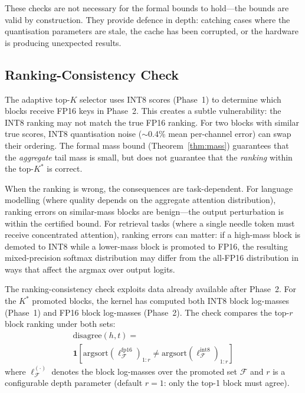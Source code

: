 \documentclass[10pt,twocolumn,a4paper]{article}
\theoremstyle{definition}
\theoremstyle{remark}
\begin{document}
These checks are not necessary for the formal bounds to hold---the bounds are valid by construction.  They provide defence in depth: catching cases where the quantisation parameters are stale, the cache has been corrupted, or the hardware is producing unexpected results.

\subsection{Ranking-Consistency Check}
\label{sec:ranking_consistency}

The adaptive top-$K$ selector uses INT8 scores (Phase~1) to determine which blocks receive FP16 keys in Phase~2.  This creates a subtle vulnerability: the INT8 ranking may not match the true FP16 ranking.  For two blocks with similar true scores, INT8 quantisation noise ($\sim$0.4\% mean per-channel error) can swap their ordering.  The formal mass bound (Theorem~\ref{thm:mass}) guarantees that the \emph{aggregate} tail mass is small, but does not guarantee that the \emph{ranking} within the top-$K^*$ is correct.

When the ranking is wrong, the consequences are task-dependent.  For language modelling (where quality depends on the aggregate attention distribution), ranking errors on similar-mass blocks are benign---the output perturbation is within the certified bound.  For retrieval tasks (where a single needle token must receive concentrated attention), ranking errors can matter: if a high-mass block is demoted to INT8 while a lower-mass block is promoted to FP16, the resulting mixed-precision softmax distribution may differ from the all-FP16 distribution in ways that affect the argmax over output logits.

The ranking-consistency check exploits data already available after Phase~2.  For the $K^*$ promoted blocks, the kernel has computed both INT8 block log-masses (Phase~1) and FP16 block log-masses (Phase~2).  The check compares the top-$r$ block ranking under both sets:
\begin{multline}
  \mathrm{disagree}(h, t) = \\
  \mathbf{1}\!\left[\mathrm{argsort}(\ell^{\mathrm{fp16}}_{\mathcal{F}})_{1:r}
  \neq \mathrm{argsort}(\ell^{\mathrm{int8}}_{\mathcal{F}})_{1:r}\right]
\end{multline}
where $\ell^{(\cdot)}_{\mathcal{F}}$ denotes the block log-masses over the promoted set $\mathcal{F}$ and $r$ is a configurable depth parameter (default $r{=}1$: only the top-1 block must agree).
\end{document}
